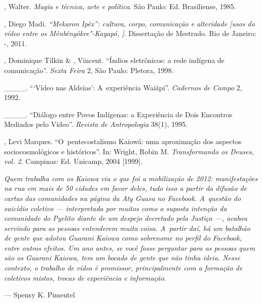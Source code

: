 \begin{Parskip}
, Walter. \emph{Magia e técnica, arte e política}. São Paulo: Ed.
Brasiliense, 1985.

, Diego Madi. \emph{``Mekaron Ipêx'': cultura, corpo, comunicação e
alteridade [usos do vídeo entre os Mênbêngôkre"-Kayapó, ]}. Dissertação
de Mestrado. Rio de Janeiro: -, 2011. 

, Dominique Tilkin \& , Vincent. ``Índios eletrônicos: a
rede indígena de comunicação''. \emph{Sexta Feira} 2, São Paulo: Pletora, 1998.

\_\_\_\_. ```Vídeo nas Aldeias': A~experiência Waiãpi''. \emph{Cadernos de Campo} 2,
1992.

\_\_\_\_. ``Diálogo entre Povos Indígenas: a Experiência de Dois Encontros
Mediados pelo Vídeo''. \emph{Revista de Antropologia} 38(1), 1995.

\smallskip
\begin{absolutelynopagebreak}
, Levi Marques. ``O~pentecostalismo Kaiowá: uma aproximação dos
aspectos sociocosmológicos e históricos''. In: Wright, Robin M.
\emph{Transformando os Deuses, vol. 2}. Campinas: Ed. Unicamp, 2004 [1999].
\end{absolutelynopagebreak}
\end{Parskip}

\clearpage

\vspace*{\fill}

\begin{flushright}
\begin{minipage}[c]{0.85\textwidth}
\raggedleft
\footnotesize
\emph{Quem trabalha com os Kaiowa viu o que foi a mobilização de 2012:
manifestações na rua em mais de 50 cidades em favor deles, tudo isso a
partir da difusão de cartas das comunidades na página da Aty Guasu no
Facebook. A~questão do suicídio coletivo --- interpretada por muitos como
a suposta intenção da comunidade do Pyelito diante de um despejo
decretado pela Justiça ---, acabou servindo para as pessoas entenderem
muita coisa. A~partir daí, há um batalhão de gente que adotou Guarani
Kaiowa como sobrenome no perfil do Facebook, entre outros efeitos. Um
ano antes, se você fosse perguntar para as pessoas quem são os Guarani
Kaiowa, tem um bocado de gente que não tinha ideia. Nesse contexto, o
trabalho de vídeo é promissor, principalmente com a formação de
coletivos mistos, trocas de experiência e informação.}

\smallskip
\hspace*{\fill}--- Spensy K. Pimentel
\end{minipage}
\end{flushright}

